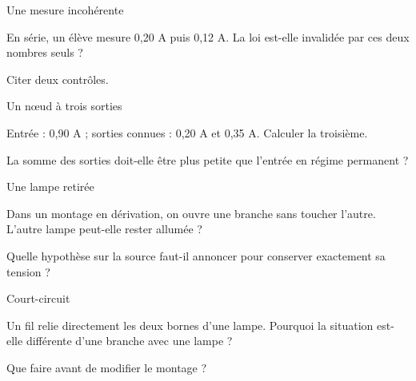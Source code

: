 \par\noindent\begin{minipage}{\linewidth}
\begin{exercice}[3]{Une mesure incohérente}
\begin{questions}
\item En série, un élève mesure 0,20 A puis 0,12 A. La loi est-elle invalidée par ces deux nombres seuls ?
\item Citer deux contrôles.
\end{questions}
\end{exercice}
\end{minipage}
\par\noindent\begin{minipage}{\linewidth}
\begin{exercice}[3]{Un nœud à trois sorties}
\begin{questions}
\item Entrée : 0,90 A ; sorties connues : 0,20 A et 0,35 A. Calculer la troisième.
\item La somme des sorties doit-elle être plus petite que l’entrée en régime permanent ?
\end{questions}
\end{exercice}
\end{minipage}
\par\noindent\begin{minipage}{\linewidth}
\begin{exercice}[3]{Une lampe retirée}
\begin{questions}
\item Dans un montage en dérivation, on ouvre une branche sans toucher l’autre. L’autre lampe peut-elle rester allumée ?
\item Quelle hypothèse sur la source faut-il annoncer pour conserver exactement sa tension ?
\end{questions}
\end{exercice}
\end{minipage}
\clearpage
\par\noindent\begin{minipage}{\linewidth}
\begin{exercice}[3]{Court-circuit}
\begin{questions}
\item Un fil relie directement les deux bornes d’une lampe. Pourquoi la situation est-elle différente d’une branche avec une lampe ?
\item Que faire avant de modifier le montage ?
\end{questions}
\end{exercice}
\end{minipage}
